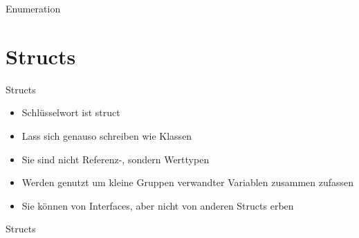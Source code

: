 \begin{frame}{Enumeration}
	
	
\end{frame}

\section{Structs}
\begin{frame}{Structs}
	\begin{itemize}
		\item Schlüsselwort ist \alert{struct}
		\item Lass sich genauso schreiben wie Klassen
		\item Sie sind nicht Referenz-, sondern Werttypen
		\item Werden genutzt um kleine Gruppen verwandter Variablen zusammen zufassen
		\item Sie können von Interfaces, aber nicht von anderen Structs erben 
	\end{itemize}
\end{frame}

\begin{frame}{Structs}
	
	
\end{frame}

